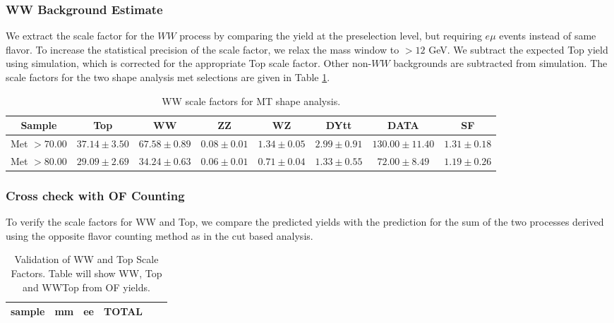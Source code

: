 \subsubsection{WW Background Estimate}

We extract the scale factor for the $WW$ process by comparing the
yield at the preselection level, but requiring $e\mu$ events instead
of same flavor. 
To increase the statistical precision of the scale factor,
we relax the mass window to $>12$ GeV.
We subtract the expected Top yield using simulation, which is 
corrected for the appropriate Top scale factor.  
Other non-$WW$ backgrounds are subtracted from simulation.
The scale factors for the two shape analysis met selections
are given in Table \ref{tab:yield_of_0jet_wwsf}.

\begin{table}[!ht]
\begin{center}
\small{
\begin{tabular}{c|c|c|c|c|c|c|c}
\hline
Sample & Top & WW & ZZ & WZ & DYtt & DATA & SF \\ \hline
Met $> 70.00$ & $37.14 \pm 3.50$ & $67.58 \pm 0.89$ & $0.08 \pm 0.01$ & $1.34 \pm 0.05$ & $2.99 \pm 0.91$ & $130.00 \pm 11.40$ & $1.31 \pm 0.18$ \\ \hline
Met $> 80.00$ & $29.09 \pm 2.69$ & $34.24 \pm 0.63$ & $0.06 \pm 0.01$ & $0.71 \pm 0.04$ & $1.33 \pm 0.55$ & $72.00 \pm 8.49$ & $1.19 \pm 0.26$ \\ \hline
\end{tabular}
\caption{WW scale factors for MT shape analysis.}
\label{tab:yield_of_0jet_wwsf}}
\end{center}
\end{table}

\subsubsection{Cross check with OF Counting}

To verify the scale factors for WW and Top, we compare the predicted yields with the prediction
for the sum of the two processes derived using the opposite flavor counting method
as in the cut based analysis.

\begin{table}[!ht]
\begin{center}
\small{
\begin{tabular}{c|c|c|c|c|c}
sample  & mm    & ee     & TOTAL\\ \hline 
\end{tabular}
\caption{Validation of WW and Top Scale Factors.  Table will show WW, Top and WWTop from OF yields.}
\label{tab:yield_presel_ofsfval}}
\end{center}
\end{table}


